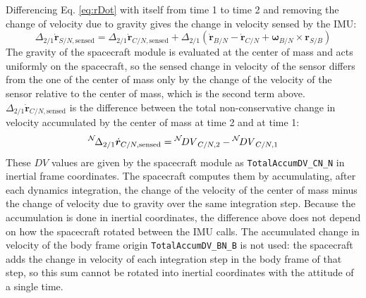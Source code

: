 Differencing Eq. \ref{eq:rDot} with itself from time 1 to time 2 and removing the change of velocity due to gravity gives the change in velocity sensed by the IMU:
\begin{equation}
	\Delta_{2/1} \dot{\bm{r}}_{S/N, \textrm{sensed}} = \Delta_{2/1} \dot{\bm{r}}_{C/N, \textrm{sensed}} + \Delta_{2/1} (\dot{\bm{r}}_{B/N} - \dot{\bm{r}}_{C/N} + \bm{\omega}_{B/N} \times \bm{r}_{S/B})
	\label{eq:DeltaVelocity}
\end{equation}
The gravity of the spacecraft module is evaluated at the center of mass and acts uniformly on the spacecraft, so the sensed change in velocity of the sensor differs from the one of the center of mass only by the change of the velocity of the sensor relative to the center of mass, which is the second term above. $\Delta_{2/1} \dot{\bm{r}}_{C/N, \textrm{sensed}}$ is the difference between the total non-conservative change in velocity accumulated by the center of mass at time 2 and at time 1:
\begin{equation}
\leftexp{N}{\Delta_{2/1} \dot{\bm{r}}_{C/N, \textrm{sensed}}} = \leftexp{N}{DV}_{C/N,2} - \leftexp{N}{DV}_{C/N,1}
\end{equation}
These $DV$ values are given by the spacecraft module as \verb|TotalAccumDV_CN_N| in inertial frame coordinates. The spacecraft computes them by accumulating, after each dynamics integration, the change of the velocity of the center of mass minus the change of velocity due to gravity over the same integration step. Because the accumulation is done in inertial coordinates, the difference above does not depend on how the spacecraft rotated between the IMU calls. The accumulated change in velocity of the body frame origin \verb|TotalAccumDV_BN_B| is not used: the spacecraft adds the change in velocity of each integration step in the body frame of that step, so this sum cannot be rotated into inertial coordinates with the attitude of a single time.

